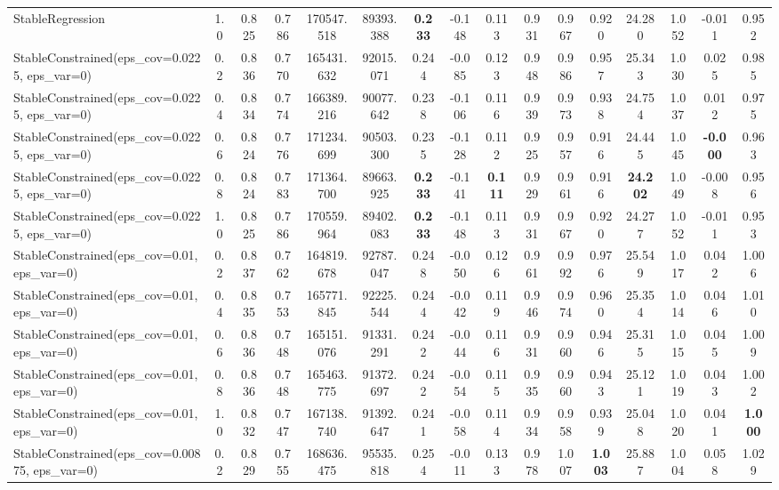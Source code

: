 \documentclass[11pt]{article}
\theoremstyle{plain}
\theoremstyle{definition}
\newcommand{\1}{\mathbf{1}}
\begin{document}
\begin{table}[h]
{\begin{tabular}{lccccccccccccccc}
StableRegression & 1.0 & 0.825 & 0.786 & 170547.518 & 89393.388 & \textbf{0.233} & -0.148 & 0.113 & 0.931 & 0.967 & 0.920 & 24.280 & 1.052 & -0.011 & 0.952 \\
StableConstrained(eps\_cov=0.0225, eps\_var=0) & 0.2 & 0.836 & 0.770 & 165431.632 & 92015.071 & 0.244 & -0.085 & 0.123 & 0.948 & 0.986 & 0.957 & 25.343 & 1.030 & 0.025 & 0.985 \\
StableConstrained(eps\_cov=0.0225, eps\_var=0) & 0.4 & 0.834 & 0.774 & 166389.216 & 90077.642 & 0.238 & -0.106 & 0.116 & 0.939 & 0.973 & 0.938 & 24.754 & 1.037 & 0.012 & 0.975 \\
StableConstrained(eps\_cov=0.0225, eps\_var=0) & 0.6 & 0.824 & 0.776 & 171234.699 & 90503.300 & 0.235 & -0.128 & 0.112 & 0.925 & 0.957 & 0.916 & 24.445 & 1.045 & \textbf{-0.000} & 0.963 \\
StableConstrained(eps\_cov=0.0225, eps\_var=0) & 0.8 & 0.824 & 0.783 & 171364.700 & 89663.925 & \textbf{0.233} & -0.141 & \textbf{0.111} & 0.929 & 0.961 & 0.916 & \textbf{24.202} & 1.049 & -0.008 & 0.956 \\
StableConstrained(eps\_cov=0.0225, eps\_var=0) & 1.0 & 0.825 & 0.786 & 170559.964 & 89402.083 & \textbf{0.233} & -0.148 & 0.113 & 0.931 & 0.967 & 0.920 & 24.277 & 1.052 & -0.011 & 0.953 \\
StableConstrained(eps\_cov=0.01, eps\_var=0) & 0.2 & 0.837 & 0.762 & 164819.678 & 92787.047 & 0.248 & -0.050 & 0.126 & 0.961 & 0.992 & 0.976 & 25.549 & 1.017 & 0.042 & 1.006 \\
StableConstrained(eps\_cov=0.01, eps\_var=0) & 0.4 & 0.835 & 0.753 & 165771.845 & 92225.544 & 0.244 & -0.042 & 0.119 & 0.946 & 0.974 & 0.960 & 25.354 & 1.014 & 0.046 & 1.010 \\
StableConstrained(eps\_cov=0.01, eps\_var=0) & 0.6 & 0.836 & 0.748 & 165151.076 & 91331.291 & 0.242 & -0.044 & 0.116 & 0.931 & 0.960 & 0.946 & 25.315 & 1.015 & 0.045 & 1.009 \\
StableConstrained(eps\_cov=0.01, eps\_var=0) & 0.8 & 0.836 & 0.748 & 165463.775 & 91372.697 & 0.242 & -0.054 & 0.115 & 0.935 & 0.960 & 0.943 & 25.121 & 1.019 & 0.043 & 1.002 \\
StableConstrained(eps\_cov=0.01, eps\_var=0) & 1.0 & 0.832 & 0.747 & 167138.740 & 91392.647 & 0.241 & -0.058 & 0.114 & 0.934 & 0.958 & 0.939 & 25.048 & 1.020 & 0.041 & \textbf{1.000} \\
StableConstrained(eps\_cov=0.00875, eps\_var=0) & 0.2 & 0.829 & 0.755 & 168636.475 & 95535.818 & 0.254 & -0.011 & 0.133 & 0.978 & 1.007 & \textbf{1.003} & 25.887 & 1.004 & 0.058 & 1.029 \\

\end{tabular}}
\end{table}
\end{document}
